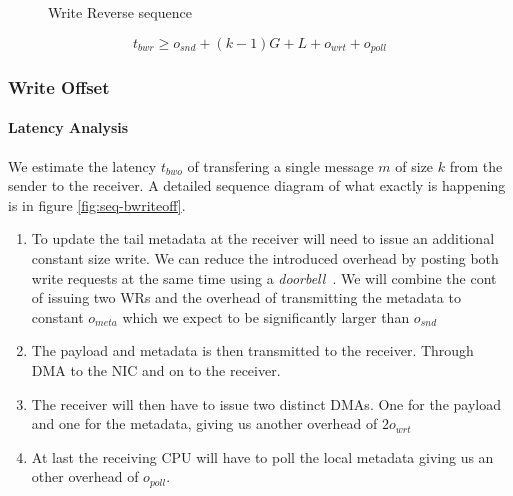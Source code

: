 \begin{figure}[!ht]
\begin{center}
\end{center}
\caption{Write Reverse sequence}
\label{fig:seq-bwriterev}
\end{figure}


$$
t_{bwr} \geq o_{snd} + (k-1)G + L + o_{wrt} + o_{poll}
$$

\subsubsection{Write Offset}

\paragraph{Latency Analysis}
We estimate the latency $t_{bwo}$ of transfering a single message $m$ of size $k$ from the sender to the receiver. 
A detailed sequence diagram of what exactly is happening is in figure \ref{fig:seq-bwriteoff}. 

\begin{enumerate}
  \item To update the tail metadata at the receiver will need to issue an additional constant size write. We can reduce the 
    introduced overhead by posting both write requests at the same time using a \emph{doorbell}~\cite{}. We will combine the
    cont of issuing two WRs and the overhead of transmitting the metadata to constant $o_{meta}$ which we expect to be 
    significantly larger than $o_{snd}$
  \item The payload and metadata is then transmitted to the receiver. Through DMA to the NIC and on to the receiver.
  \item The receiver will then have to issue two distinct DMAs. One for the payload and one for the metadata, giving us another
    overhead of $2o_{wrt}$
  \item At last the receiving CPU will have to poll the local metadata giving us an other overhead of $o_{poll}$.
\end{enumerate}


